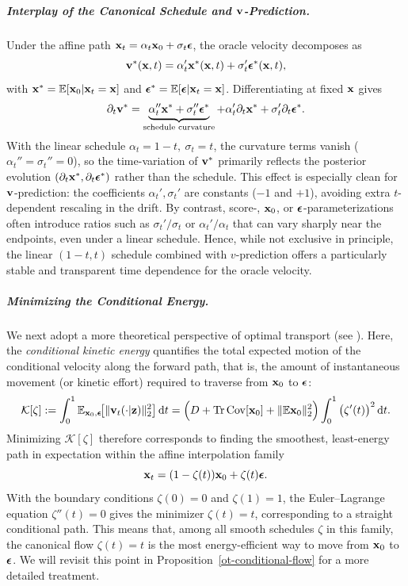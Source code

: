 \subparagraph{Interplay of the Canonical Schedule and ${\mathbf{v}}$-Prediction.}
Under the affine path ${\mathbf{x}}_t=\alpha_t {\mathbf{x}}_0+\sigma_t{\bm{\epsilon}}$, the oracle velocity decomposes as
\[
{\mathbf{v}}^*({\mathbf{x}}, t)=\alpha_t' {\mathbf{x}}^*({\mathbf{x}},t)+\sigma_t' {\bm{\epsilon}}^*({\mathbf{x}},t),
\]
with ${\mathbf{x}}^*=\mathbb{E}[{\mathbf{x}}_0|{\mathbf{x}}_t={\mathbf{x}}]$ and $ {\bm{\epsilon}}^*=\mathbb{E}[{\bm{\epsilon}}|{\mathbf{x}}_t={\mathbf{x}}]$.
Differentiating at fixed ${\mathbf{x}}$ gives
\[
\partial_t {\mathbf{v}}^*
=\underbrace{\alpha_t'' {\mathbf{x}}^*+\sigma_t'' {\bm{\epsilon}}^*}_{\text{schedule curvature}}
+ \alpha_t' \partial_t {\mathbf{x}}^*+\sigma_t' \partial_t {\bm{\epsilon}}^*.
\]
With the linear schedule $\alpha_t=1-t,\ \sigma_t=t$, the curvature terms vanish
($\alpha_t''=\sigma_t''=0$), so the time-variation of ${\mathbf{v}}^*$ primarily reflects the
posterior evolution $(\partial_t {\mathbf{x}}^*,\partial_t {\bm{\epsilon}}^*)$ rather than the schedule.
This effect is especially clean for ${\mathbf{v}}$-prediction: the coefficients $\alpha_t',\sigma_t'$
are constants ($-1$ and $+1$), avoiding extra $t$-dependent rescaling in the drift.
By contrast, score-, ${\mathbf{x}}_0$, or ${\bm{\epsilon}}$-parameterizations often introduce ratios such as
$\sigma_t'/\sigma_t$ or $\alpha_t'/\alpha_t$ that can vary sharply near the endpoints,
even under a linear schedule. Hence, while not exclusive in principle, the linear
$(1-t,t)$ schedule combined with $v$-prediction offers a particularly stable and
transparent time dependence for the oracle velocity.

\subparagraph{Minimizing the Conditional Energy.} We next adopt a more theoretical perspective of optimal transport (see ). 
Here, the \emph{conditional kinetic energy} quantifies the total expected motion 
of the conditional velocity along the forward path, that is,
the amount of instantaneous movement (or kinetic effort) required to traverse from 
${\mathbf{x}}_0$ to ${\bm{\epsilon}}$:
\[
\mathcal K[\zeta]
:=\int_0^1 \mathbb{E}_{{\mathbf{x}}_0,{\bm{\epsilon}}}\!\big[\|{\mathbf{v}}_t(\cdot |{\mathbf{z}})\|_2^2\big]\mathop{}\!\mathrm{d} t
=\Big(D+\operatorname{Tr}\mathrm{Cov}[{\mathbf{x}}_0]+\|\mathbb{E}{\mathbf{x}}_0\|_2^2\Big)
\int_0^1 \big(\zeta'(t)\big)^2\mathop{}\!\mathrm{d} t.
\]
Minimizing $\mathcal K[\zeta]$ therefore corresponds to finding the smoothest, least-energy
path in expectation within the affine interpolation family
\[
{\mathbf{x}}_t=(1-\zeta(t)){\mathbf{x}}_0+\zeta(t){\bm{\epsilon}}.
\]
With the boundary conditions $\zeta(0)=0$ and $\zeta(1)=1$, the
Euler--Lagrange equation $\zeta''(t)=0$ gives the minimizer $\zeta(t)=t$, corresponding to a
straight conditional path. This means that, among all smooth schedules $\zeta$ in this family,
the canonical flow $\zeta(t)=t$ is the most energy-efficient way to move from ${\mathbf{x}}_0$ to
${\bm{\epsilon}}$. We will revisit this point in Proposition~\ref{ot-conditional-flow}
for a more detailed treatment.


